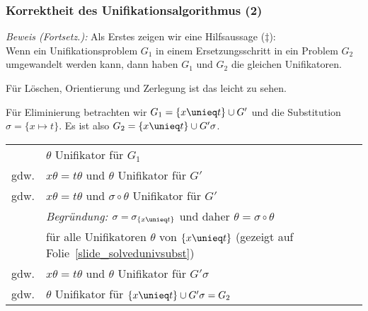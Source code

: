 \documentclass[aspectratio=1610,onlymath]{beamer}
\begin{document}
\begin{frame}[t]\frametitle{Korrektheit des Unifikationsalgorithmus (2)}


\emph{Beweis (Fortsetz.):} Als Erstes zeigen wir eine Hilfsaussage ($\ddagger$):\\[1ex]
Wenn ein Unifikationsproblem $G_1$ in einem Ersetzungsschritt in ein Problem $G_2$
umgewandelt werden kann, dann haben $G_1$ und $G_2$ die gleichen Unifikatoren.
\bigskip\pause

Für \alert{Löschen}, \alert{Orientierung} und \alert{Zerlegung} ist das leicht zu sehen.\medskip\pause

Für \alert{Eliminierung} betrachten wir $G_1=\{x\unieq t\}\cup G'$ und die Substitution
$\sigma=\{x\mapsto t\}$. Es ist also $G_2=\{x\unieq t\}\cup G'\sigma$.\medskip\pause

\begin{tabular}{rl}
	 & $\theta$ Unifikator für $G_1$ \pause\\[-0.5ex]
gdw. & $x\theta=t\theta$ und $\theta$ Unifikator für $G'$ \pause\\[-0.5ex]
gdw. & $x\theta=t\theta$ und $\sigma\circ\theta$ Unifikator für $G'$ \\[-1ex]
	& \emph{Begründung:} $\sigma=\sigma_{\{x\unieq t\}}$ und daher $\theta=\sigma\circ\theta$\\[-1ex]
	& für alle Unifikatoren $\theta$ von $\{x\unieq t\}$ (gezeigt auf Folie~\ref{slide_solvedunivsubst})\pause\\[-0.5ex]
gdw. & $x\theta=t\theta$ und $\theta$ Unifikator für $G'\sigma$ \pause\\[-0.5ex]
gdw. & $\theta$ Unifikator für $\{x\unieq t\}\cup G'\sigma=G_2$
\end{tabular}

\end{frame}
\end{document}
